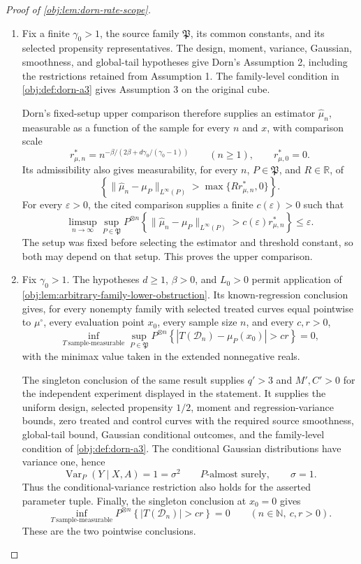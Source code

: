 \begin{proof}[Proof of \cref{obj:lem:dorn-rate-scope}]
\begin{enumerate}
\item Fix a finite \(\gamma_0>1\), the source family \(\mathfrak P\), its common constants, and its selected propensity representatives. The design, moment, variance, Gaussian, smoothness, and global-tail hypotheses give Dorn's Assumption 2, including the restrictions retained from Assumption 1. The family-level condition in \cref{obj:def:dorn-a3} gives Assumption 3 on the original cube.

Dorn's fixed-setup upper comparison \citep[Section 2, Assumptions 1--3, Theorem 1(ii)]{Dorn2026GlobalOverlap} therefore supplies an estimator \(\widehat\mu_n\), measurable as a function of the sample for every \(n\) and \(x\), with comparison scale
\[
r^*_{\mu,n}
=
n^{-\beta/(2\beta+d\gamma_0/(\gamma_0-1))}
\qquad(n\ge1),
\qquad r^*_{\mu,0}=0.
\]
Its admissibility also gives measurability, for every \(n\), \(P\in\mathfrak P\), and \(R\in\mathbb R\), of
\[
\left\{
\|\widehat\mu_n-\mu_P\|_{L^\infty(P)}
>
\max\{Rr^*_{\mu,n},0\}
\right\}.
\]
For every \(\varepsilon>0\), the cited comparison supplies a finite \(c(\varepsilon)>0\) such that
\[
\limsup_{n\to\infty}\sup_{P\in\mathfrak P}
P^{\otimes n}\!\left\{
\|\widehat\mu_n-\mu_P\|_{L^\infty(P)}
>
c(\varepsilon)r^*_{\mu,n}
\right\}
\le\varepsilon.
\]
The setup was fixed before selecting the estimator and threshold constant, so both may depend on that setup. This proves the upper comparison.

\item Fix \(\gamma_0>1\). The hypotheses \(d\ge1\), \(\beta>0\), and \(L_0>0\) permit application of \cref{obj:lem:arbitrary-family-lower-obstruction}. Its known-regression conclusion gives, for every nonempty family with selected treated curves equal pointwise to \(\mu^\circ\), every evaluation point \(x_0\), every sample size \(n\), and every \(c,r>0\),
\[
\inf_{T\ \mathrm{sample\text{-}measurable}}
\sup_{P\in\mathfrak P}
P^{\otimes n}\!\left\{
|T(\mathcal D_n)-\mu_P(x_0)|>cr
\right\}
=0,
\]
with the minimax value taken in the extended nonnegative reals.

The singleton conclusion of the same result supplies \(q'>3\) and \(M',C'>0\) for the independent experiment displayed in the statement. It supplies the uniform design, selected propensity \(1/2\), moment and regression-variance bounds, zero treated and control curves with the required source smoothness, global-tail bound, Gaussian conditional outcomes, and the family-level condition of \cref{obj:def:dorn-a3}. The conditional Gaussian distributions have variance one, hence
\[
\operatorname{Var}_{P}(Y\mid X,A)=1=\sigma^2
\qquad P\text{-almost surely},
\qquad \sigma=1.
\]
Thus the conditional-variance restriction also holds for the asserted parameter tuple. Finally, the singleton conclusion at \(x_0=0\) gives
\[
\inf_{T\ \mathrm{sample\text{-}measurable}}
P^{\otimes n}\!\left\{|T(\mathcal D_n)|>cr\right\}
=0
\qquad(n\in\mathbb N,\ c,r>0).
\]
These are the two pointwise conclusions.
\end{enumerate}
\end{proof}
